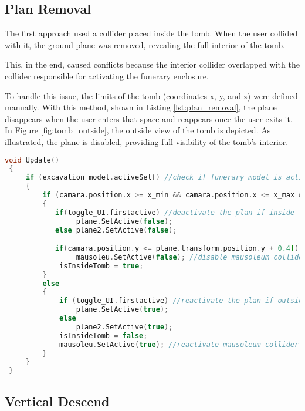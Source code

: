 \subsection*{Plan Removal}

The first approach used a collider placed inside the tomb. When the user collided with it, the ground plane was removed, revealing the full interior of the tomb.

This, in the end, caused conflicts because the interior collider overlapped with the collider responsible for activating the funerary enclosure.

To handle this issue, the limits of the tomb (coordinates x, y, and z) were defined manually. With this method, shown in Listing \ref{lst:plan_removal}, the plane disappears when the user enters that space and reappears once the user exits it.
In Figure \ref{fig:tomb_outside}, the outside view of the tomb is depicted. As illustrated, the plane is disabled, providing full visibility of the tomb’s interior.


\begin{lstlisting}[language=C++, caption={Plan Removal approach in Update method().}, label={lst:plan_removal},float]
 void Update()
 {
     if (excavation_model.activeSelf) //check if funerary model is active
     {
         if (camara.position.x >= x_min && camara.position.x <= x_max && camara.position.z <= z_max && camara.position.z >= z_min && camara.position.y <= y_max && camara.position.y >= y_min)
         {
            if(toggle_UI.firstactive) //deactivate the plan if inside the tomb area
                 plane.SetActive(false);
            else plane2.SetActive(false);

            if(camara.position.y <= plane.transform.position.y + 0.4f) 
                 mausoleu.SetActive(false); //disable mausoleum collider so the user can fall inside the tomb without colliding
             isInsideTomb = true;
         }
         else
         {
             if (toggle_UI.firstactive) //reactivate the plan if outside the tomb area
                 plane.SetActive(true);
             else
                 plane2.SetActive(true);
             isInsideTomb = false;
             mausoleu.SetActive(true); //reactivate mausoleum collider 
         }
     }
 }
\end{lstlisting}
\subsection*{Vertical Descend}

